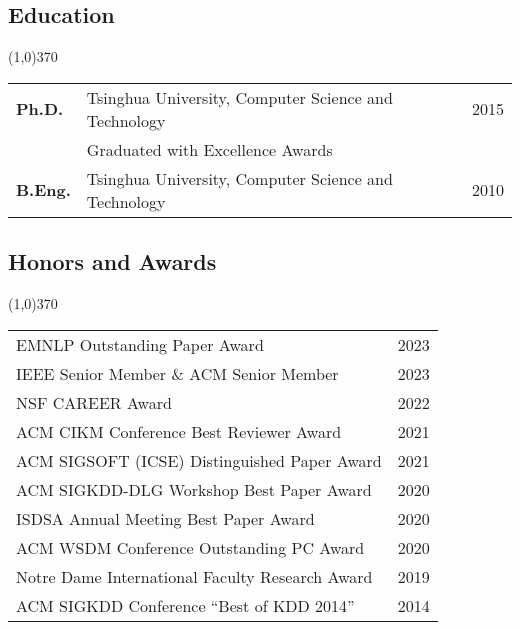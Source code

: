 \documentclass[10pt]{article}
\begin{document}
\subsection{\sc Education}
\vspace{-0.4cm} \line(1,0){370} \vspace{-0.1cm}

\begin{table}[h!]
\begin{tabular*}{12.7cm}{p{1.15cm}p{10.00cm}r}
\bf{Ph.D.}&Tsinghua University, Computer Science and Technology&2015\\
&\multicolumn{2}{l}{Graduated with Excellence Awards} \\ %
\bf{B.Eng.}&Tsinghua University, Computer Science and Technology&2010

\end{tabular*}
\end{table}

\vspace{-0.6cm}
\subsection{\sc Honors and Awards}
\vspace{-0.4cm} \line(1,0){370} \vspace{-0.1cm}

\begin{table}[h!]
\begin{tabular*}{12.7cm}{p{11.65cm}r}
EMNLP Outstanding Paper Award & 2023 \\
IEEE Senior Member \& ACM Senior Member & 2023 \\
NSF CAREER Award & 2022 \\
ACM CIKM Conference Best Reviewer Award & 2021 \\	
ACM SIGSOFT (ICSE) Distinguished Paper Award & 2021 \\
ACM SIGKDD-DLG Workshop Best Paper Award & 2020 \\
ISDSA Annual Meeting Best Paper Award & 2020 \\
ACM WSDM Conference Outstanding PC Award & 2020 \\
Notre Dame International Faculty Research Award & 2019 \\
ACM SIGKDD Conference ``Best of KDD 2014'' & 2014 \\
\end{tabular*}
\end{table}
\end{document}
